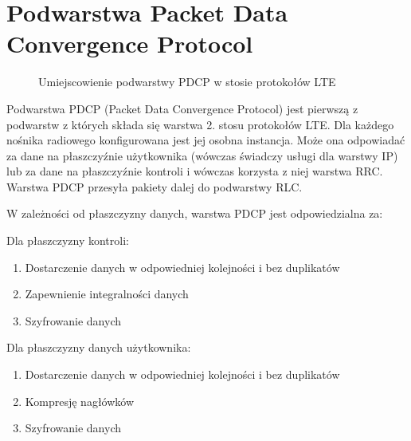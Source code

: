 \chapter{Podwarstwa Packet Data Convergence Protocol}
\label{cha:pdcp}

\begin{figure}[ht]
	\centerline{}
	\caption{Umiejscowienie podwarstwy PDCP w stosie protokołów LTE}
	\label{fig:pdcpseq}
\end{figure}

Podwarstwa PDCP (Packet Data Convergence Protocol) jest pierwszą z podwarstw z których składa się warstwa 2. stosu protokołów LTE. Dla każdego nośnika radiowego konfigurowana jest jej osobna instancja. Może ona odpowiadać za dane na płaszczyźnie użytkownika (wówczas świadczy usługi dla warstwy IP) lub za dane na płaszczyźnie kontroli i wówczas korzysta z niej warstwa RRC. Warstwa PDCP przesyła pakiety dalej do podwarstwy RLC.

W zależności od płaszczyzny danych, warstwa PDCP jest odpowiedzialna za:

Dla płaszczyzny kontroli:
\begin{enumerate}
	\item Dostarczenie danych w odpowiedniej kolejności i bez duplikatów
	\item Zapewnienie integralności danych
	\item Szyfrowanie danych
\end{enumerate}

Dla płaszczyzny danych użytkownika:
\begin{enumerate}
	\item Dostarczenie danych w odpowiedniej kolejności i bez duplikatów
	\item Kompresję nagłówków
	\item Szyfrowanie danych
\end{enumerate}

